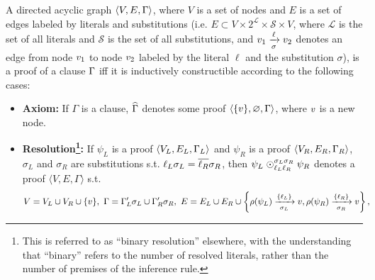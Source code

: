 \begin{definition} 
\label{def:proof}%
A directed acyclic graph $\langle V, E, \clause \rangle$, where $V$ is a set of nodes and $E$ is a
set of edges labeled by literals and substitutions (i.e. $E \subset V \times 2^{\mathcal{L}} \times \mathcal{S} \times V$, where $\mathcal{L}$ is the set of all literals and $\mathcal{S}$ is the set of all substitutions, and $\n_1
\xrightarrow[\sigma]{\ell} \n_2$ denotes an edge from node $\n_1$ to node $\n_2$ labeled by the literal $\ell$ and the substitution $\sigma$), is a
proof of a clause $\clause$ iff it is inductively constructible according to the following cases:
%
\begin{itemize}
  \item \textbf{Axiom:} If $\Gamma$ is a clause, $\axiom{\Gamma}$ denotes some proof $\langle \{ \n \}, \varnothing,
    \Gamma \rangle$, where $\n$ is a new node. %
  \item \textbf{Resolution\footnote{This is referred to as ``binary resolution'' elsewhere, with the understanding that ``binary'' refers to the number of resolved literals, rather than the number of premises of the inference rule.}:} If $\psi_L$ is a proof $\langle V_L, E_L, \clause_L \rangle$ and
    $\psi_R$ is a proof $\langle V_R, E_R, \clause_R \rangle$, $\sigma_L$ and $\sigma_R$ are substitutions s.t. $\ell_L\sigma_L=\dual{\ell_R}\sigma_R$,
    then
    $\psi_L \res{\ell_L}{\sigma_L}{\ell_R}{\sigma_R} \psi_R$ denotes a proof $\langle V, E, \Gamma \rangle$ s.t.
\begin{align*}
     V  &= V_L \cup V_R \cup \{\n \}, ~\Gamma = \clause_L' \sigma_L \cup  \clause_R' \sigma_R,~
     E = E_L \cup E_R \cup  \left\{ \raiz{\psi_L} \xrightarrow[\sigma_L]{\{\ell_L\} } \n,   \raiz{\psi_R} \xrightarrow[\sigma_R]{\{\ell_R\} } \n \right\},

\end{align*}
\end{itemize}
\end{definition}
